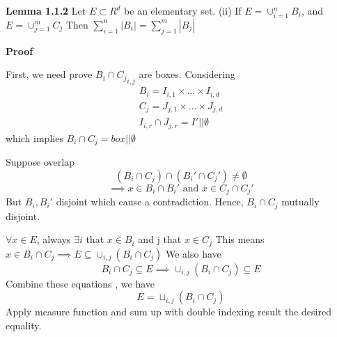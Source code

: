 \textbf{Lemma 1.1.2} Let $E \subset R^d$ be an elementary set.
(ii) If $E = \cup_{i=1}^n B_i$, and $E = \cup_{j=1}^m C_j$
Then $\sum_{i=1}^n |B_i| = \sum_{j=1}^m |B_j|$

\textbf{Proof}

First, we need prove ${B_i \cap C_j}_{i,j}$ are boxes. Considering
\[
\begin{split}
B_i = I_{i,1} \times \dots \times I_{i,d}\\
C_j = J_{j,1} \times \dots \times J_{j,d}\\
I_{i,r} \cap J_{j,r} = I' || \emptyset
\end{split}
\]
which implies $B_i \cap C_j = box || \emptyset $

Suppose overlap 
\[
(B_i \cap C_j) \cap (B_i' \cap C_j') \neq \emptyset
\]
\[
\implies x \in B_i \cap B_i' \text{ and } x \in C_j \cap C_j'
\]
But $B_i, B_i'$ disjoint which cause a contradiction.
Hence, $B_i \cap C_j$ mutually disjoint.

$\forall x \in E$, always $\exists i$ that $x \in B_i$ and j that $x \in C_j$
This means $x \in B_i \cap C_j \implies E \subseteq \cup_{i,j}(B_i \cap C_j)$ 
We also have
\[
B_i \cap C_j \subseteq E \implies \cup_{i,j}(B_i \cap C_j) \subseteq E
\]
Combine these equations , we have
\[
E = \sqcup_{i,j} (B_i \cap C_j)
\]
Apply measure function and sum up with double indexing result the desired equality.
